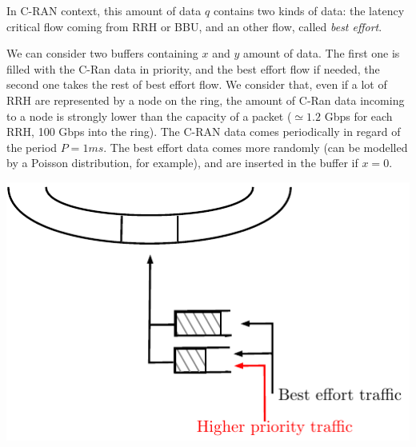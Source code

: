 \documentclass[a4paper,10pt]{article}
\begin{document}
In C-RAN context, this amount of data $q$ contains two kinds of data: the latency critical flow coming from RRH or BBU, and an other flow, called {\em best effort}.

We can consider two buffers containing $x$ and $y$ amount of data. The first one is filled with the C-Ran data in priority, and the best effort flow if needed, the second one takes the rest of best effort flow. We consider that, even if a lot of RRH are represented by a node on the ring, the amount of C-Ran data incoming to a node is strongly lower than the capacity of a packet ($\simeq 1.2$ Gbps for each RRH, 100 Gbps into the ring).
The C-RAN data comes periodically in regard of the period $P = 1ms$. 
The best effort data comes more randomly (can be modelled by a Poisson distribution, for example), and are inserted in the buffer if $x = 0$.

\begin{center}   

      \includegraphics[scale=0.7]{insertion1.pdf}

  
\end{center}
 
 
\end{document}
